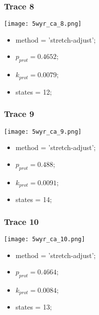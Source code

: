 \subsubsection{Trace 8}
\begin{minipage}[c]{0.7\textwidth}
    \texttt{[image: 5wyr\_ca\_8.png]}
\end{minipage}
\hfill
\begin{minipage}[c]{0.45\textwidth}
    \begin{itemize}
        \item method = 'stretch-adjust';
        \item $p_{prot}=0.4652$;
        \item $k_{prot}=0.0079$;
        \item states = 12;
    \end{itemize}
\end{minipage}

\subsubsection{Trace 9}
\begin{minipage}[c]{0.7\textwidth}
    \texttt{[image: 5wyr\_ca\_9.png]}
\end{minipage}
\hfill
\begin{minipage}[c]{0.45\textwidth}
    \begin{itemize}
        \item method = 'stretch-adjust';
        \item $p_{prot}=0.488$;
        \item $k_{prot}=0.0091$;
        \item states = 14;
    \end{itemize}
\end{minipage}

\subsubsection{Trace 10}
\begin{minipage}[c]{0.7\textwidth}
    \texttt{[image: 5wyr\_ca\_10.png]}
\end{minipage}
\hfill
\begin{minipage}[c]{0.45\textwidth}
    \begin{itemize}
        \item method = 'stretch-adjust';
        \item $p_{prot}=0.4664$;
        \item $k_{prot}=0.0084$;
        \item states = 13;
    \end{itemize}
\end{minipage}

